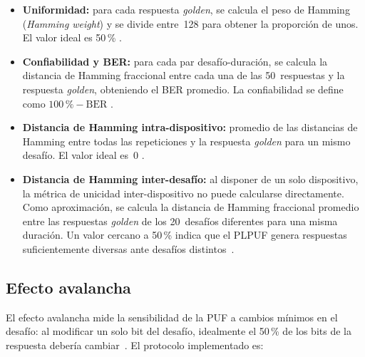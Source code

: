 \begin{itemize}
  \item \textbf{Uniformidad:} para cada respuesta \textit{golden}, se calcula
    el peso de Hamming (\textit{Hamming weight}) y se divide entre~128 para
    obtener la proporción de unos. El valor ideal es 50\,\%
    \cite{maiti_2012_systematic}.

  \item \textbf{Confiabilidad y BER:} para cada par desafío-duración, se
    calcula la distancia de Hamming fraccional entre cada una de las
    50~respuestas y la respuesta \textit{golden}, obteniendo el BER
    promedio. La confiabilidad se define como $100\,\% - \text{BER}$
    \cite{maiti_2012_systematic}.

  \item \textbf{Distancia de Hamming intra-dispositivo:} promedio de las
    distancias de Hamming entre todas las repeticiones y la respuesta
    \textit{golden} para un mismo desafío. El valor ideal es~0
    \cite{hori_2011_pseudolfsr}.

  \item \textbf{Distancia de Hamming inter-desafío:} al disponer de un solo
    dispositivo, la métrica de unicidad inter-dispositivo no puede calcularse
    directamente. Como aproximación, se calcula la distancia de Hamming
    fraccional promedio entre las respuestas \textit{golden} de los
    20~desafíos diferentes para una misma duración. Un valor cercano a 50\,\%
    indica que el PLPUF genera respuestas suficientemente diversas ante
    desafíos distintos~\cite{hori_2011_pseudolfsr}.
\end{itemize}

\subsection{Efecto avalancha}
\label{sec:avalanche}

El efecto avalancha mide la sensibilidad de la PUF a cambios mínimos en el
desafío: al modificar un solo bit del desafío, idealmente el 50\,\% de los
bits de la respuesta debería cambiar~\cite{maiti_2012_systematic}. El
protocolo implementado es:

